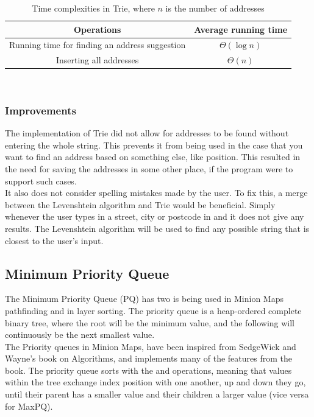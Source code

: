 \begin{table}[ht]
  \centering
  \begin{tabular}{ c|c }
   \textbf{Operations} & \textbf{Average running time}\\
   \hline
    Running time for finding an address suggestion & $\Theta(\log n)$\\
    Inserting all addresses & $\Theta(n)$ \\
  \end{tabular}\\
  \caption{\centering Time complexities in Trie, where $n$ is the number of addresses}\label{Trie/timecomplexity}
\end{table}
\subsubsection{Improvements}
The implementation of Trie did not allow for addresses to be found without entering the whole string. This prevents it from being used in the case that you want to find an address based on something else, like position. This resulted in the need for saving the addresses in some other place, if the program were to support such cases.\\
It also does not consider spelling mistakes made by the user. To fix this, a merge between the Levenshtein algorithm and Trie would be beneficial. Simply whenever the user types in a street, city or postcode in and it does not give any results. The Levenshtein algorithm will be used to find any possible string that is closest to the user’s input.
\subsection{Minimum Priority Queue}
The Minimum Priority Queue (PQ) has two is being used in Minion Maps pathfinding and in layer sorting. The priority queue is a heap-ordered complete binary tree, where the root will be the minimum value, and the following will continuously be the next smallest value.\\
The Priority queues in Minion Maps, have been inspired from SedgeWick and Wayne’s book on Algorithms, and implements many of the features from the book.
The priority queue sorts with the  and  operations, meaning that values within the tree exchange index position with one another, up and down they go, until their parent has a smaller value and their children a larger value (vice versa for MaxPQ).
